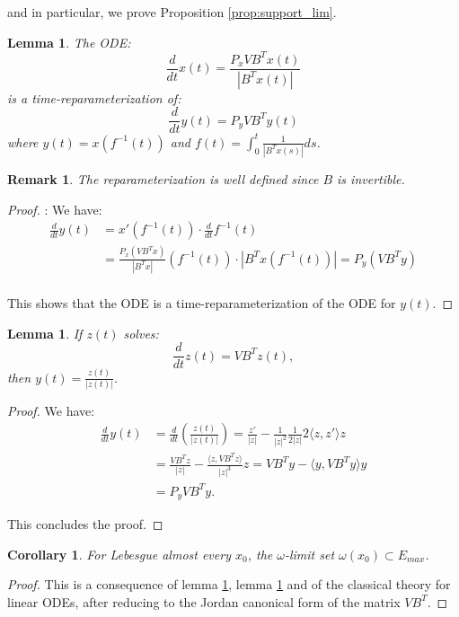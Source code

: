 \documentclass{article}
\numberwithin{theorem}{section}
\newtheorem{corollary}[theorem]{Corollary}
\newtheorem{lemma}[theorem]{Lemma}
\newtheorem{remark}[theorem]{Remark}
\begin{document}
and in particular, we prove Proposition \ref{prop:support_lim}.
\begin{lemma} 
\label{lem:time_repar}
The ODE:
\begin{equation}
\label{eq:PVQK_ODE}
    \frac{d}{dt} x(t) = \frac{P_x V B^T x(t)}{|B^T x(t)|}
\end{equation}
is a time-reparameterization of:
$$
\frac{d}{dt} y(t) = P_y V B^T y(t)
$$
where $y(t)=x(f^{-1}(t))$ and $f(t)=\int_0^t \frac{1}{|B^T x(s)|} ds$. 
\end{lemma}
\begin{remark}
The reparameterization is well defined since $B$ is invertible.
\end{remark}
\begin{proof}: We have:
\begin{align*}
\frac{d}{dt} y(t) &= x'(f^{-1}(t)) \cdot \frac{d}{dt} f^{-1}(t)\\
&= \frac{P_x(VB^Tx)}{|B^Tx|}(f^{-1}(t))\cdot{|B^T x(f^{-1}(t))|}=P_y(VB^Ty)\\
\end{align*}

This shows that the ODE is a time-reparameterization of the ODE for $y(t)$.
\end{proof}

\begin{lemma} 
\label{lem:normal}
If $z(t)$ solves:
$$
\frac{d}{dt} z(t) = V B^T z(t),
$$
then $y(t)=\frac{z(t)}{|z(t)|}$.
\end{lemma}
\begin{proof} We have:
\begin{align*}
\frac{d}{dt} y(t) &= \frac{d}{dt} \left(\frac{z(t)}{|z(t)|}\right) = \frac{z'}{|z|}-\frac{1}{|z|^2}\frac{1}{2|z|}2\langle z, z'\rangle z \\
&=\frac{VB^Tz}{|z|}-\frac{\langle z, VB^T z\rangle}{|z|^3}z = VB^Ty-\langle y, VB^Ty\rangle y\\
&= P_y VB^T y.
\end{align*}

This concludes the proof.
\end{proof}

\begin{corollary}
\label{cor:w_limit}
    For Lebesgue almost every $x_0$, the $\omega$-limit set $\omega(x_0)\subset E_{max}$. 
\end{corollary}
\begin{proof} This is a consequence of lemma \ref{lem:time_repar}, lemma \ref{lem:normal} and of the classical theory for linear ODEs, after reducing to the Jordan canonical form of the matrix $VB^T$.
\end{proof}
\end{document}

